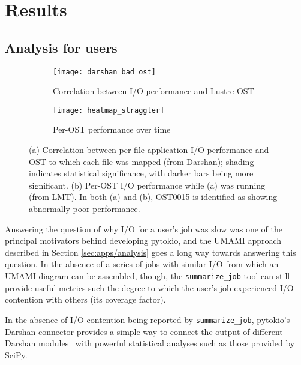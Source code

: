 \section{Results} \label{sec:results}


\subsection{Analysis for users} \label{sec:results/users}

\begin{figure}
    \centering
    \begin{subfigure}{0.55\textwidth}
    	\texttt{[image: darshan\_bad\_ost]}
        \caption{Correlation between I/O performance and Lustre OST}
        \label{fig:stragging-ost/correlation}
    \end{subfigure}
    \begin{subfigure}{0.55\textwidth}
    	\texttt{[image: heatmap\_straggler]}
        \caption{Per-OST performance over time}
        \label{fig:stragging-ost/heatmap}
    \end{subfigure}
    \caption{(a) Correlation between per-file application I/O performance and OST to which each file was mapped (from Darshan); shading indicates statistical significance, with darker bars being more significant.
    (b) Per-OST I/O performance while (a) was running (from LMT).
    In both (a) and (b), OST0015 is identified as showing abnormally poor performance.
    }
    \label{fig:straggling-ost}
    \vspace{-.2in}
\end{figure}

Answering the question of why I/O for a user's job was slow was one of the principal motivators behind developing pytokio, and the UMAMI approach described in Section \ref{sec:apps/analysis} goes a long way towards answering this question.
In the absence of a series of jobs with similar I/O from which an UMAMI diagram can be assembled, though, the \texttt{summarize\_job} tool can still provide useful metrics such the degree to which the user's job experienced I/O contention with others (its coverage factor).

In the absence of I/O contention being reported by \texttt{summarize\_job}, pytokio's Darshan connector provides a simple way to connect the output of different Darshan modules~\cite{Snyder2016modular} with powerful statistical analyses such as those provided by SciPy.

